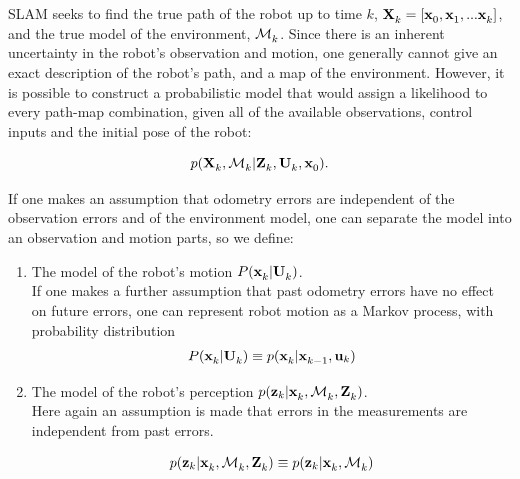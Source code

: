 
SLAM seeks to find the true path of the robot up to time $k$,
$\Xall{k}{}{} = [\x{0}{}{}, \x{1}{}{}, ... \x{k}{}{}]$, and the true
model of the environment, $\map{k}{}{}$. Since there is an inherent
uncertainty in the robot's observation and motion, one generally
cannot give an exact description of the robot's path, and a map of the
environment. However, it is possible to construct a probabilistic
model that would assign a likelihood to every path-map combination,
given all of the available observations, control inputs and the
initial pose of the robot:

\begin{equation}
 p(\Xall{k}{}{}, \map{k}{}{} | \Zall{k}{}, \Uall{k}{}, \x{0}{}{}).
\label{eqn:map}
\end{equation}

If one makes an assumption that odometry errors are independent of the
observation errors and of the environment model, one can separate the
model into an observation and motion parts, so we define:

\begin{enumerate}

\item The model of the robot's motion $P(\x{k}{}{} | \Uall{k}{})$. \\
If one makes a further assumption that past odometry errors have no
effect on future errors, one can represent robot motion as a Markov
process, with probability distribution 
\begin{equation}
 P(\x{k}{}{} | \Uall{k}{}) \equiv p(\x{k}{}{}| \x{k-1}{}{}, \U{k})
\end{equation}


\item The model of the robot's perception
$p(\z{k}| \x{k}{}{},\map{k}{}{}, \Zall{k}{})$.\\
Here again an assumption is made that errors in the measurements are
independent from past errors.


\begin{equation}
p(\z{k}| \x{k}{}{},\map{k}{}{}, \Zall{k}{}) \equiv 
  p(\z{k}| \x{k}{}{},\map{k}{}{})
\end{equation}


\end{enumerate}

